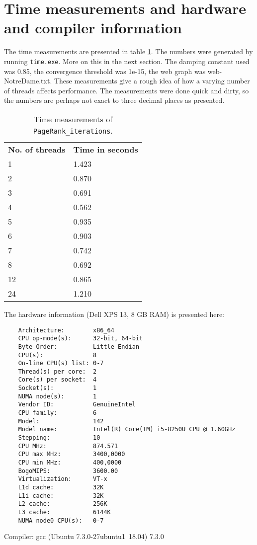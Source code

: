 \documentclass{in1150-innlevering}
\begin{document}
\section*{Time measurements and hardware and compiler information}
\label{sec:time_measurements_and_hardware_and_compiler_information}
	The time measurements are presented in table \ref{tab:time}. The numbers were generated by running \texttt{time.exe}. More on this in the next section. The damping constant used was 0.85, the convergence threshold was 1e-15, the web graph was web-NotreDame.txt. These measurements give a rough idea of how a varying number of threads affects performance. The measurements were done quick and dirty, so the numbers are perhaps not exact to three decimal places as presented.
	\begin{table}
		\begin{center}
			\begin{tabular}{ll}
				\textbf{No. of threads} & \textbf{Time in seconds} \\
				1 & 1.423 \\
				2 & 0.870 \\
				3 & 0.691 \\
				4 & 0.562 \\
				5 & 0.935 \\
				6 & 0.903 \\
				7 & 0.742 \\
				8 & 0.692 \\
				12 & 0.865 \\
				24 & 1.210 \\
			\end{tabular}
			\caption{Time measurements of \texttt{PageRank\_iterations}.}
			\label{tab:time}
		\end{center}
	\end{table}
	The hardware information (Dell XPS 13, 8 GB RAM) is presented here:
	\begin{lstlisting}
	Architecture:        x86_64
	CPU op-mode(s):      32-bit, 64-bit
	Byte Order:          Little Endian
	CPU(s):              8
	On-line CPU(s) list: 0-7
	Thread(s) per core:  2
	Core(s) per socket:  4
	Socket(s):           1
	NUMA node(s):        1
	Vendor ID:           GenuineIntel
	CPU family:          6
	Model:               142
	Model name:          Intel(R) Core(TM) i5-8250U CPU @ 1.60GHz
	Stepping:            10
	CPU MHz:             874.571
	CPU max MHz:         3400,0000
	CPU min MHz:         400,0000
	BogoMIPS:            3600.00
	Virtualization:      VT-x
	L1d cache:           32K
	L1i cache:           32K
	L2 cache:            256K
	L3 cache:            6144K
	NUMA node0 CPU(s):   0-7
	\end{lstlisting}
	Compiler: gcc (Ubuntu 7.3.0-27ubuntu1~18.04) 7.3.0
\end{document}
